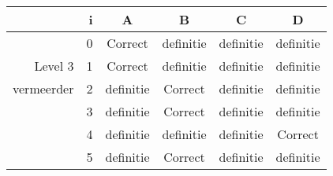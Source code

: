 \begin{tabular}{ rr| c|c|c|c}\hline\hline
     & i & \textbf{A} & \textbf{B} & \textbf{C} & \textbf{D}\\\hline

&0&Correct\cellcolor[gray]{0.6}&definitie&definitie&definitie\\
Level 3 & 1&Correct\cellcolor[gray]{0.6}&definitie&definitie&definitie\\
vermeerder &2&definitie&Correct\cellcolor[gray]{0.6}&definitie&definitie\\
&3&definitie&Correct\cellcolor[gray]{0.6}&definitie&definitie\\
&4&definitie&definitie&definitie&Correct\cellcolor[gray]{0.6}\\
&5&definitie&Correct\cellcolor[gray]{0.6}&definitie&definitie\\
\hline\end{tabular}\par\ \newline

